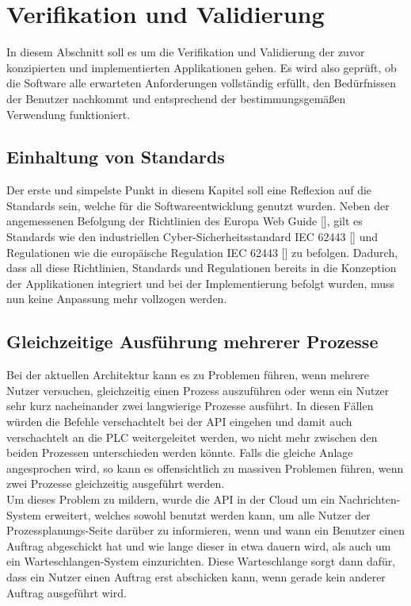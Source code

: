 \section{Verifikation und Validierung}
\label{sec:verifikationUndValidierung}

In diesem Abschnitt soll es um die Verifikation und Validierung der zuvor konzipierten und implementierten Applikationen gehen. Es wird also geprüft, ob die Software alle erwarteten Anforderungen vollständig erfüllt, den Bedürfnissen der Benutzer nachkommt und entsprechend der bestimmungsgemäßen Verwendung funktioniert.

\subsection{Einhaltung von Standards}
\label{subsec:standards}

Der erste und simpelste Punkt in diesem Kapitel soll eine Reflexion auf die Standards sein, welche für die Softwareentwicklung genutzt wurden. Neben der angemessenen Befolgung der Richtlinien des Europa Web Guide [\cite{guidelineWeb}], gilt es Standards wie den industriellen Cyber-Sicherheitsstandard IEC 62443 [\cite{IEC62443}] und Regulationen wie die europäische Regulation IEC 62443 [\cite{euDataProtectionRegulation}] zu befolgen. Dadurch, dass all diese Richtlinien, Standards und Regulationen bereits in die Konzeption der Applikationen integriert und bei der Implementierung befolgt wurden, muss nun keine Anpassung mehr vollzogen werden.

\subsection{Gleichzeitige Ausführung mehrerer Prozesse}
\label{subsec:gleichzeitigeAusführung}

Bei der aktuellen Architektur kann es zu Problemen führen, wenn mehrere Nutzer versuchen, gleichzeitig einen Prozess auszuführen oder wenn ein Nutzer sehr kurz nacheinander zwei langwierige Prozesse ausführt. In diesen Fällen würden die Befehle verschachtelt bei der API eingehen und damit auch verschachtelt an die PLC weitergeleitet werden, wo nicht mehr zwischen den beiden Prozessen unterschieden werden könnte. Falls die gleiche Anlage angesprochen wird, so kann es offensichtlich zu massiven Problemen führen, wenn zwei Prozesse gleichzeitig ausgeführt werden.\\
Um dieses Problem zu mildern, wurde die API in der Cloud um ein Nachrichten-System erweitert, welches sowohl benutzt werden kann, um alle Nutzer der Prozessplanungs-Seite darüber zu informieren, wenn und wann ein Benutzer einen Auftrag abgeschickt hat und wie lange dieser in etwa dauern wird, als auch um ein Warteschlangen-System einzurichten. Diese Warteschlange sorgt dann dafür, dass ein Nutzer einen Auftrag erst abschicken kann, wenn gerade kein anderer Auftrag ausgeführt wird.

